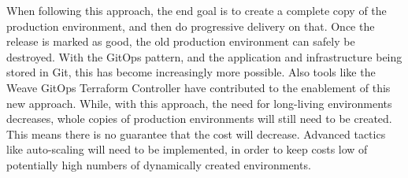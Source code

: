 When following this approach, the end goal is to create a complete copy of the production environment,
and then do progressive delivery on that.
Once the release is marked as good, the old production environment can safely be destroyed.
With the GitOps pattern, and the application and infrastructure being stored in Git,
this has become increasingly more possible.
Also tools like the Weave GitOps Terraform Controller have contributed to the enablement of this new approach. 
While, with this approach, the need for long-living environments decreases,
whole copies of production environments will still need to be created.
This means there is no guarantee that the cost will decrease.
Advanced tactics like auto-scaling will need to be implemented, in order to
keep costs low of potentially high numbers of dynamically created environments.





































